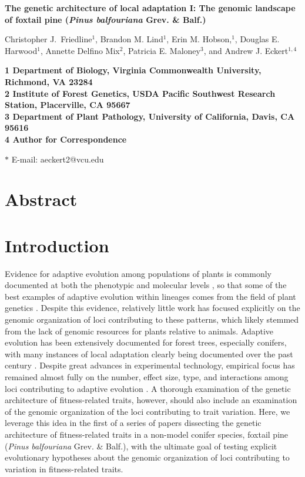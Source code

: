 \documentclass[11pt]{article}
\begin{document}
\begin{flushleft} 
\singlespacing
{\Large \textbf{The genetic architecture of local adaptation I: The genomic landscape of 
foxtail pine (\textit{Pinus balfouriana} Grev. \& Balf.)}}


Christopher J.\ Friedline$^{1}$, 
Brandon M. Lind$^{1}$,
Erin M. Hobson,$^{1}$,
Douglas E. Harwood$^{1}$, 
Annette Delfino Mix$^{2}$,
Patricia E. Maloney$^{3}$, and
Andrew J. Eckert$^{1,4}$


\bf{1} Department of Biology, Virginia Commonwealth University, Richmond, VA 23284
\\
\bf{2} Institute of Forest Genetics, USDA Pacific Southwest Research Station, Placerville, 
CA 95667
\\
\bf{3} Department of Plant Pathology, University of California, Davis, CA 95616
\\
\bf{4} Author for Correspondence
\null

$\ast$ E-mail: aeckert2@vcu.edu
\end{flushleft}

\section*{Abstract}

\section*{Introduction}

Evidence for adaptive evolution among populations of plants is commonly documented at both the phenotypic 
and molecular levels \citep{Kawecki:2004, Pannell:2013}, so that some of the best
examples of adaptive evolution within lineages comes from the field of plant genetics \citep[e.g.,][]{Antonovics:1970}. 
Despite this evidence, relatively little work has focused explicitly on the genomic organization of loci contributing
to these patterns\citep{Hoffman:2008}, which likely stemmed from the lack of genomic resources for plants relative to animals.
Adaptive evolution has been extensively documented for forest trees, especially conifers, with many instances of 
local adaptation clearly being documented over the past century \citep{White:2007, Neale:2011}. Despite great advances 
in experimental technology, empirical focus has remained almost fully on the number, effect size, type, and interactions 
among loci contributing to adaptive evolution \citep{Neale:2011, Alberto:2013}.  A thorough examination of the 
genetic architecture of fitness-related traits, however, should also include 
an examination of the genomic organization of the loci contributing to trait variation. Here, we leverage 
this idea in the first of a series of papers dissecting the genetic architecture of fitness-related 
traits in a non-model conifer species, foxtail pine (\textit{Pinus balfouriana} Grev. \& Balf.), with the 
ultimate goal of testing explicit evolutionary hypotheses about the genomic organization of loci 
contributing to variation in fitness-related traits.
\end{document}
